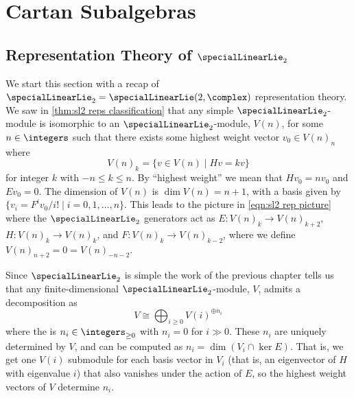\documentclass[fleqn]{NotesClass}
\newcommand{\isomorphic}{\cong}
\begin{document}
    \chapter{Cartan Subalgebras}
    \section{Representation Theory of \texorpdfstring{\(\specialLinearLie_2\)}{sl2}}
    We start this section with a recap of \(\specialLinearLie_2 = \specialLinearLie(2, \complex)\) representation theory.
    We saw in \cref{thm:sl2 reps classification} that any simple \(\specialLinearLie_2\)-module is isomorphic to an \(\specialLinearLie_2\)-module, \(V(n)\), for some \(n \in \integers\) such that there exists some highest weight vector \(v_0 \in V(n)_n\) where
    \begin{equation}
        V(n)_k = \{v \in V(n) \mid Hv = kv\}
    \end{equation}
    for integer \(k\) with \(-n \le k \le n\).
    By \enquote{highest weight} we mean that \(Hv_0 = nv_0\) and \(Ev_0 = 0\).
    The dimension of \(V(n)\) is \(\dim V(n) = n + 1\), with a basis given by \(\{v_i = F^i v_0/i! \mid i = 0, 1, \dotsc, n\}\).
    This leads to the picture in \cref{eqn:sl2 rep picture} where the \(\specialLinearLie_2\) generators act as \(E \colon V(n)_k \to V(n)_{k+2}\), \(H \colon V(n)_k \to V(n)_k\), and \(F \colon V(n)_k \to V(n)_{k-2}\), where we define \(V(n)_{n+2} = 0 = V(n)_{-n-2}\).
    
    Since \(\specialLinearLie_2\) is simple the work of the previous chapter tells us that any finite-dimensional \(\specialLinearLie_2\)-module, \(V\), admits a decomposition as
    \begin{equation}
        V \isomorphic \bigoplus_{i \ge 0} V(i)^{\oplus n_i}
    \end{equation}
    where the  is \(n_i \in \integers_{\ge 0}\) with \(n_i = 0\) for \(i \gg 0\).
    These \(n_i\) are uniquely determined by \(V\), and can be computed as \(n_i = \dim(V_i \cap \ker E)\).
    That is, we get one \(V(i)\) submodule for each basis vector in \(V_i\) (that is, an eigenvector of \(H\) with eigenvalue \(i\)) that also vanishes under the action of \(E\), so the highest weight vectors of \(V\) determine \(n_i\).
    
\end{document}
